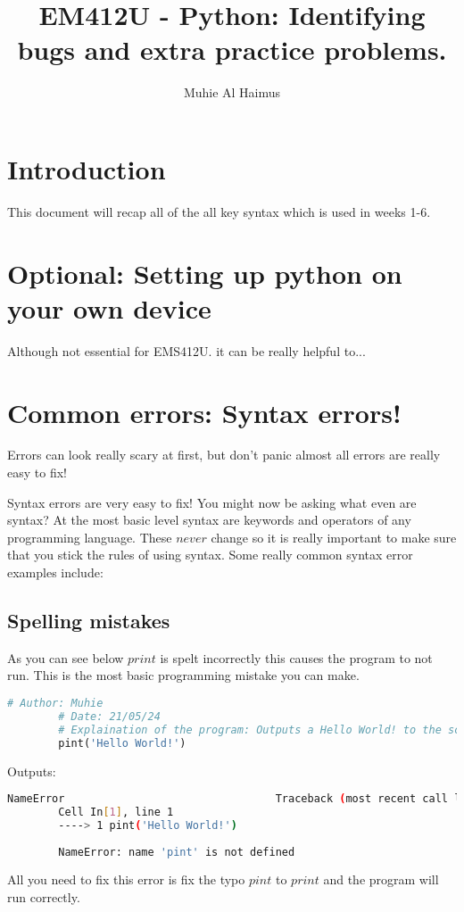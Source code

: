 \documentclass{article}
\title{EM412U - Python: Identifying bugs and extra practice problems.}
\author{Muhie Al Haimus}
\begin{document}
	\maketitle
	\section{Introduction}
	This document will recap all of the all key syntax which is used in weeks 1-6.
	
	\section{Optional: Setting up python on your own device}
	Although not essential for EMS412U. it can be really helpful to...
	\section{Common errors: Syntax errors!}
	Errors can look really scary at first, but don't panic almost all errors are really easy to fix!
	
	Syntax errors are very easy to fix! You might now be asking what even are syntax? At the most basic level syntax are keywords and operators of any programming language. These $never$ change so it is really important to make sure that you stick the rules of using syntax. Some really common syntax error examples include:
	
	\subsection{Spelling mistakes}
	As you can see below $print$ is spelt incorrectly this causes the program to not run. This is the most basic programming mistake you can make.
	\begin{lstlisting}[language=Python]
		# Author: Muhie
		# Date: 21/05/24
		# Explaination of the program: Outputs a Hello World! to the screen
		pint('Hello World!')
	\end{lstlisting}
	Outputs:
	\begin{lstlisting}[language=Bash]
		NameError                                 Traceback (most recent call last)
		Cell In[1], line 1
		----> 1 pint('Hello World!')
		
		NameError: name 'pint' is not defined
	\end{lstlisting}
	All you need to fix this error is fix the typo $pint$ to $print$ and the program will run correctly.
\end{document}
